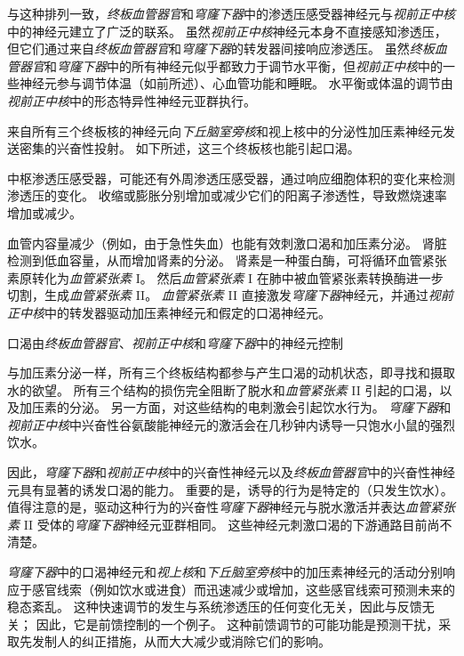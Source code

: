 与这种排列一致，\textit{终板血管器官}和\textit{穹窿下器}中的渗透压感受器神经元与\textit{视前正中核}中的神经元建立了广泛的联系。
虽然\textit{视前正中核}神经元本身不直接感知渗透压，但它们通过来自\textit{终板血管器官}和\textit{穹窿下器}的转发器间接响应渗透压。
虽然\textit{终板血管器官}和\textit{穹窿下器}中的所有神经元似乎都致力于调节水平衡，但\textit{视前正中核}中的一些神经元参与调节体温（如前所述）、心血管功能和睡眠。
水平衡或体温的调节由\textit{视前正中核}中的形态特异性神经元亚群执行。


来自所有三个终板核的神经元向\textit{下丘脑室旁核}和视上核中的分泌性加压素神经元发送密集的兴奋性投射。
如下所述，这三个终板核也能引起口渴。


中枢渗透压感受器，可能还有外周渗透压感受器，通过响应细胞体积的变化来检测渗透压的变化。
收缩或膨胀分别增加或减少它们的阳离子渗透性，导致燃烧速率增加或减少。


血管内容量减少（例如，由于急性失血）也能有效刺激口渴和加压素分泌。
肾脏检测到低血容量，从而增加肾素的分泌。
肾素是一种蛋白酶，可将循环血管紧张素原转化为\textit{血管紧张素} I。
然后\textit{血管紧张素} I 在肺中被血管紧张素转换酶进一步切割，生成\textit{血管紧张素} II。
\textit{血管紧张素} II 直接激发\textit{穹窿下器}神经元，并通过\textit{视前正中核}中的转发器驱动加压素神经元和假定的口渴神经元。


口渴由\textit{终板血管器官}、\textit{视前正中核}和\textit{穹窿下器}中的神经元控制

与加压素分泌一样，所有三个终板结构都参与产生口渴的动机状态，即寻找和摄取水的欲望。
所有三个结构的损伤完全阻断了脱水和\textit{血管紧张素} II 引起的口渴，以及加压素的分泌。
另一方面，对这些结构的电刺激会引起饮水行为。
\textit{穹窿下器}和\textit{视前正中核}中兴奋性谷氨酸能神经元的激活会在几秒钟内诱导一只饱水小鼠的强烈饮水。


因此，\textit{穹窿下器}和\textit{视前正中核}中的兴奋性神经元以及\textit{终板血管器官}中的兴奋性神经元具有显著的诱发口渴的能力。
重要的是，诱导的行为是特定的（只发生饮水）。
值得注意的是，驱动这种行为的兴奋性\textit{穹窿下器}神经元与脱水激活并表达\textit{血管紧张素} II 受体的\textit{穹窿下器}神经元亚群相同。
这些神经元刺激口渴的下游通路目前尚不清楚。


\textit{穹窿下器}中的口渴神经元和\textit{视上核}和\textit{下丘脑室旁核}中的加压素神经元的活动分别响应于感官线索（例如饮水或进食）而迅速减少或增加，这些感官线索可预测未来的稳态紊乱。
这种快速调节的发生与系统渗透压的任何变化无关，因此与反馈无关；
因此，它是前馈控制的一个例子。
这种前馈调节的可能功能是预测干扰，采取先发制人的纠正措施，从而大大减少或消除它们的影响。


